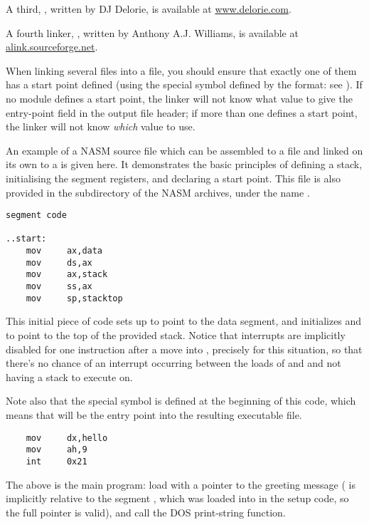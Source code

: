 A third, , written by DJ Delorie, is available at
\href{http://www.delorie.com/djgpp/16bit/djlink/}{www.delorie.com}.

A fourth linker, , written by
Anthony A.J. Williams, is available at \href{http://alink.sourceforge.net}
{alink.sourceforge.net}.

When linking several  files into a  file, you should
ensure that exactly one of them has a start point defined (using the
 special symbol defined by the
 format: see ). If no module defines a start
point, the linker will not know what value to give the entry-point
field in the output file header; if more than one defines a start
point, the linker will not know \emph{which} value to use.

An example of a NASM source file which can be assembled to a
 file and linked on its own to a  is given here. It
demonstrates the basic principles of defining a stack, initialising
the segment registers, and declaring a start point. This file is
also provided in the  subdirectory of
the NASM archives, under the name .

\begin{lstlisting}
segment code

..start:
    mov     ax,data
    mov     ds,ax
    mov     ax,stack
    mov     ss,ax
    mov     sp,stacktop
\end{lstlisting}

This initial piece of code sets up  to point to the data
segment, and initializes  and  to point to the top of
the provided stack. Notice that interrupts are implicitly disabled
for one instruction after a move into , precisely for this
situation, so that there's no chance of an interrupt occurring
between the loads of  and  and not having a stack to
execute on.

Note also that the special symbol  is defined at the
beginning of this code, which means that will be the entry point
into the resulting executable file.

\begin{lstlisting}
    mov     dx,hello
    mov     ah,9
    int     0x21
\end{lstlisting}

The above is the main program: load  with a pointer to the
greeting message ( is implicitly relative to the segment
, which was loaded into  in the setup code, so the
full pointer is valid), and call the DOS print-string function.

